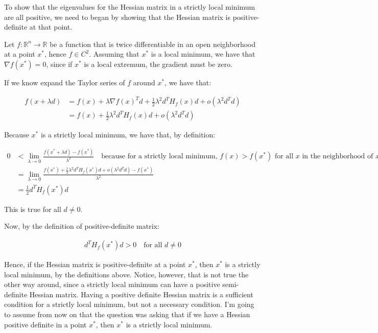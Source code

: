 \documentclass{article}
\begin{document}
To show that the eigenvalues for the Hessian matrix in a strictly local minimum are all positive, 
we need to began by showing that the Hessian matrix is positive-definite at that point.

Let $f: \mathbb{R}^n \rightarrow \mathbb{R}$ be a function that is twice differentiable in an open neighborhood at a point $x^*$, hence
$f \in C^2$. Assuming that $x^*$ is a local minimum, we have that $\nabla f(x^*) = 0$, since if $x^*$ is a local extremum,
the gradient must be zero.

If we know expand the Taylor series of $f$ around $x^*$, we have that:

\begin{align*}
    f(x + \lambda d) &= f(x) + \lambda \nabla f(x)^T d + \frac{1}{2} \lambda^2 d^T H_f(x) d + o(\lambda^2 d^T d) \\
    &= f(x) + \frac{1}{2} \lambda^2 d^T H_f(x) d + o(\lambda^2 d^T d)
\end{align*}

Because $x^*$ is a strictly local minimum, we have that, by definition:

\begin{align*}
    0 &< \lim_{\lambda \rightarrow 0} \frac{f(x^* + \lambda d) - f(x^*)}{\lambda^2} \quad \text{because for a strictly local minimum, $f(x) > f(x^*)$ for all $x$ in the neighborhood of $x^*$} \\
    &= \lim_{\lambda \rightarrow 0} \frac{f(x^*) + \frac{1}{2} \lambda^2 d^T H_f(x^*) d + o(\lambda^2 d^T d) - f(x^*)}{\lambda^2} \\
    &= \frac{1}{2} d^T H_f(x^*) d
\end{align*}

This is true for all $d \neq 0$.

Now, by the definition of positive-definite matrix:

\begin{align*}
    d^T H_f(x^*) d > 0 \quad \text{for all $d \neq 0$}
\end{align*}

Hence, if the Hessian matrix is positive-definite at a point $x^*$, then $x^*$ is a strictly local minimum,
by the definitions above. Notice, however, that is not true the other way around, since a strictly local minimum
can have a positive semi-definite Hessian matrix. Having a positive definite Hessian matrix is a sufficient condition
for a strictly local minimum, but not a necessary condition. I'm going to assume from now on that the question
was asking that if we have a Hessian positive definite in a point $x^*$, then $x^*$ is a strictly local minimum.
\end{document}
